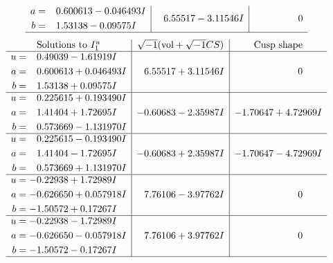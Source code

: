 \documentclass[1p]{elsarticle_modified}
\theoremstyle{definition}
\newcommand{\I}{\sqrt{-1}}
\begin{document}
$$\begin{array}{c|c|c}
\begin{aligned}
a &= \phantom{-}0.600613 - 0.046493 I \\
b &= \phantom{-}1.53138 - 0.09575 I\end{aligned}
 & \phantom{-}6.55517 - 3.11546 I & \phantom{-0.000000 } 0\\
 \hline 
 \end{array}$$\newpage$$\begin{array}{c|c|c}  
\text{Solutions to }I^u_{1}& \I (\text{vol} + \sqrt{-1}CS) & \text{Cusp shape}\\
 \hline 
\begin{aligned}
u &= \phantom{-}0.49039 - 1.61919 I \\
a &= \phantom{-}0.600613 + 0.046493 I \\
b &= \phantom{-}1.53138 + 0.09575 I\end{aligned}
 & \phantom{-}6.55517 + 3.11546 I & \phantom{-0.000000 } 0 \\ \hline\begin{aligned}
u &= \phantom{-}0.225615 + 0.193490 I \\
a &= \phantom{-}1.41404 + 1.72695 I \\
b &= \phantom{-}0.573669 - 1.131970 I\end{aligned}
 & -0.60683 - 2.35987 I & -1.70647 + 4.72969 I \\ \hline\begin{aligned}
u &= \phantom{-}0.225615 - 0.193490 I \\
a &= \phantom{-}1.41404 - 1.72695 I \\
b &= \phantom{-}0.573669 + 1.131970 I\end{aligned}
 & -0.60683 + 2.35987 I & -1.70647 - 4.72969 I \\ \hline\begin{aligned}
u &= -0.22938 + 1.72989 I \\
a &= -0.626650 + 0.057918 I \\
b &= -1.50572 + 0.17267 I\end{aligned}
 & \phantom{-}7.76106 - 3.97762 I & \phantom{-0.000000 } 0 \\ \hline\begin{aligned}
u &= -0.22938 - 1.72989 I \\
a &= -0.626650 - 0.057918 I \\
b &= -1.50572 - 0.17267 I\end{aligned}
 & \phantom{-}7.76106 + 3.97762 I & \phantom{-0.000000 } 0\\
 \hline 
 \end{array}$$\newpage\newpage\renewcommand{\arraystretch}{1}
\end{document}
